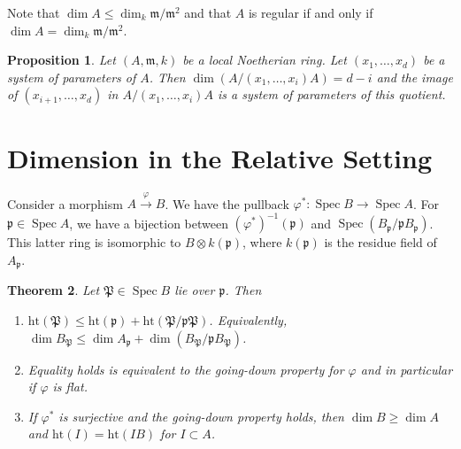 \documentclass[leqno, openany]{memoir}
\newtheorem{thm}{Theorem}[section]
\newtheorem{prop}[thm]{Proposition}
\theoremstyle{definition}
\theoremstyle{remark}
\theoremstyle{plain}
\theoremstyle{definition}
\theoremstyle{remark}
\newcommand{\mf}[1]{\mathfrak{#1}}
\newcommand{\mr}[1]{\mathrm{#1}}
\DeclareMathOperator{\Spec}{Spec}
\begin{document}
Note that $\dim A \leq \dim_k \mf{m} / \mf{m}^2$ and that $A$ is regular if and only if $\dim A = \dim_k \mf{m} / \mf{m}^2$.

\begin{prop}
    Let $(A, \mf{m}, k)$ be a local Noetherian ring. Let $(x_1, \ldots, x_d)$ be a system of parameters of $A$. Then $\dim(A / (x_1, \ldots, x_i)A) = d-i$ and the image of $(x_{i+1}, \ldots, x_d)$ in $A / (x_1, \ldots, x_i)A$ is a system of parameters of this quotient.
\end{prop}

\section{Dimension in the Relative Setting}%
\label{sec:dimension_in_the_relative_setting}

Consider a morphism $A \xrightarrow{\varphi} B$. We have the pullback $\varphi^* \colon \Spec B \to \Spec A$. For $\mf{p} \in \Spec A$, we have a bijection between $(\varphi^*)^{-1}(\mf{p})$ and $\Spec(B_{\mf{p}} / \mf{p}B_{\mf{p}})$. This latter ring is isomorphic to $B \otimes k(\mf{p})$, where $k (\mf{p})$ is the residue field of $A_{\mf{p}}$.

\begin{thm}
    Let $\mf{P} \in \Spec B$ lie over $\mf{p}$. Then
    \begin{enumerate}
        \item $\mr{ht}(\mf{P}) \leq \mr{ht}(\mf{p}) + \mr{ht}(\mf{P} / \mf{p}\mf{P})$. Equivalently, $\dim B_{\mf{P}} \leq \dim A_{\mf{p}} + \dim (B_{\mf{P}} / \mf{p}B_{\mf{P}})$.
        \item Equality holds is equivalent to the going-down property for $\varphi$ and in particular if $\varphi$ is flat.
        \item If $\varphi^*$ is surjective and the going-down property holds, then $\dim B \geq \dim A$ and $\mr{ht}(I) = \mr{ht}(IB)$ for $I \subset A$.
    \end{enumerate}
\end{thm}
\end{document}
